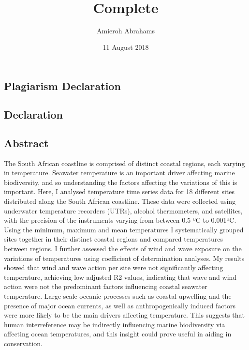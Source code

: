 \documentclass[12pt,]{article}
\title{Complete}
\author{Amieroh Abrahams}
\date{11 August 2018}
\begin{document}
\maketitle

{
\setcounter{tocdepth}{3}
\tableofcontents
}
\newpage

\subsection{Plagiarism Declaration}\label{plagiarism-declaration}

\newpage

\subsection{Declaration}\label{declaration}

\newpage

\subsection{Abstract}\label{abstract}

The South African coastline is comprised of distinct coastal regions,
each varying in temperature. Seawater temperature is an important driver
affecting marine biodiversity, and so understanding the factors
affecting the variations of this is important. Here, I analysed
temperature time series data for 18 different sites distributed along
the South African coastline. These data were collected using underwater
temperature recorders (UTRs), alcohol thermometers, and satellites, with
the precision of the instruments varying from between 0.5 ºC to 0.001ºC.
Using the minimum, maximum and mean temperatures I systematically
grouped sites together in their distinct coastal regions and compared
temperatures between regions. I further assessed the effects of wind and
wave exposure on the variations of temperatures using coefficient of
determination analyses. My results showed that wind and wave action per
site were not significantly affecting temperature, achieving low
adjusted R2 values, indicating that wave and wind action were not the
predominant factors influencing coastal seawater temperature. Large
scale oceanic processes such as coastal upwelling and the presence of
major ocean currents, as well as anthropogenically induced factors were
more likely to be the main drivers affecting temperature. This suggests
that human interreference may be indirectly influencing marine
biodiversity via affecting ocean temperatures, and this insight could
prove useful in aiding in conservation.
\end{document}
